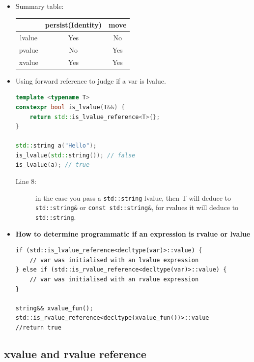 \documentclass[a4paper,11pt,twoside]{book}
\newcommand{\tophline}{\hline }
\newcommand{\bottomhline}{\\ \hline }
\newcommand{\tophline}{ }
\newcommand{\bottomhline}{ }
\begin{document}
\begin{itemize}
	\item Summary table: 
	\begin{center}
		\begin{tabular}{|c|c|c|}
			\tophline
			& persist(Identity) & move \\
			\tophline
			lvalue & Yes & No \\
			\tophline
			pvalue & No & Yes \\
			\tophline
			xvalue & Yes & Yes \bottomhline
		\end{tabular}
	\end{center}
	



\item Using forward reference to judge if a var is lvalue.
\begin{lstlisting}[frame=single, language=c++]
template <typename T>
constexpr bool is_lvalue(T&&) {
	return std::is_lvalue_reference<T>{};
}

std::string a("Hello");
is_lvalue(std::string()); // false
is_lvalue(a); // true  
\end{lstlisting}

\begin{description}
    \item[Line 8:] in the case you pass a \texttt{std::string} lvalue, then T will deduce to \texttt{std::string\&} or \texttt{const std::string\&}, for rvalues it will deduce to \texttt{std::string}.
\end{description}

\item \textbf{How to determine programmatic if an expression is rvalue or lvalue}
\begin{lstlisting}[numbers=none]
if (std::is_lvalue_reference<decltype(var)>::value) {
	// var was initialised with an lvalue expression
} else if (std::is_rvalue_reference<decltype(var)>::value) {
	// var was initialised with an rvalue expression
}

string&& xvalue_fun();
std::is_rvalue_reference<decltype(xvalue_fun())>::value
//return true
\end{lstlisting}

\end{itemize}

\subsection{xvalue and rvalue reference}
\end{document}
